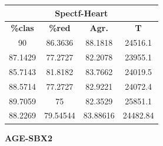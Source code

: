 \documentclass[11pt,a4paper]{article}
\theoremstyle{definition}
\begin{document}
\begin{tabbing}
{		\begin{tabular}{|c|c|c|c|}
			\hline
			\multicolumn{4}{|c|}{\textbf{Spectf-Heart}} \\ \hline
			\textbf{\%clas} & \textbf{\%red} & \textbf{Agr.} & \textbf{T} \\ \hline 
			90 & 86.3636 & 88.1818 & 24516.1 \\ \hline
87.1429 & 77.2727 & 82.2078 & 23955.1 \\ \hline
85.7143 & 81.8182 & 83.7662 & 24019.5 \\ \hline
88.5714 & 77.2727 & 82.9221 & 24072.4 \\ \hline
89.7059 & 75 & 82.3529 & 25851.1 \\ \hline
88.2269 & 79.54544 & 83.88616 & 24482.84 \\ \hline
		\end{tabular}
		}
	\end{tabbing}
	

	
	\textbf{AGE-SBX2}	
	
\end{document}
